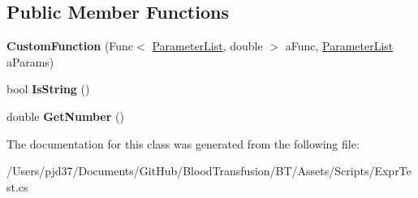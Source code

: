 \subsection*{Public Member Functions}
\begin{DoxyCompactItemize}
\item 
{\bfseries Custom\+Function} (Func$<$ \hyperlink{class_b83_1_1_logic_expression_parser_1_1_parameter_list}{Parameter\+List}, double $>$ a\+Func, \hyperlink{class_b83_1_1_logic_expression_parser_1_1_parameter_list}{Parameter\+List} a\+Params)\hypertarget{class_b83_1_1_logic_expression_parser_1_1_custom_function_a3439217b747e65290fb4c00ad1cfe8b6}{}\label{class_b83_1_1_logic_expression_parser_1_1_custom_function_a3439217b747e65290fb4c00ad1cfe8b6}

\item 
bool {\bfseries Is\+String} ()\hypertarget{class_b83_1_1_logic_expression_parser_1_1_custom_function_ade89d1c0f4c28c5a287f3488ed3ee1da}{}\label{class_b83_1_1_logic_expression_parser_1_1_custom_function_ade89d1c0f4c28c5a287f3488ed3ee1da}

\item 
double {\bfseries Get\+Number} ()\hypertarget{class_b83_1_1_logic_expression_parser_1_1_custom_function_ac05287f07b73df30ab2e6c8a968e6b49}{}\label{class_b83_1_1_logic_expression_parser_1_1_custom_function_ac05287f07b73df30ab2e6c8a968e6b49}

\end{DoxyCompactItemize}


The documentation for this class was generated from the following file\+:\begin{DoxyCompactItemize}
\item 
/\+Users/pjd37/\+Documents/\+Git\+Hub/\+Blood\+Transfusion/\+B\+T/\+Assets/\+Scripts/Expr\+Test.\+cs\end{DoxyCompactItemize}
